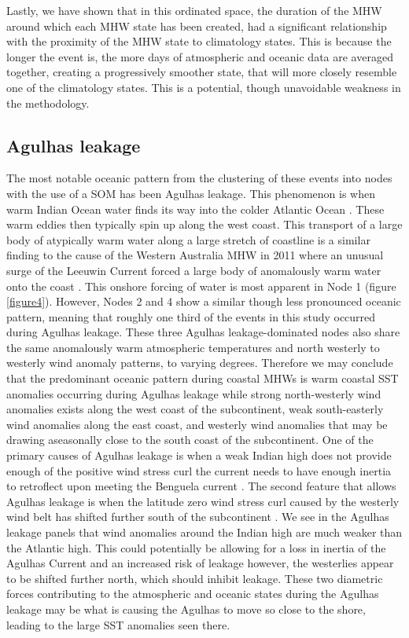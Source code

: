 \documentclass[utf8]{frontiersSCNS}
\begin{document}
Lastly, we have shown that in this ordinated space, the duration of the MHW around which each MHW state has been created, had a significant relationship with the proximity of the MHW state to climatology states. This is because the longer the event is, the more days of atmospheric and oceanic data are averaged together, creating a progressively smoother state, that will more closely resemble one of the climatology states. This is a potential, though unavoidable weakness in the methodology.

\subsection{Agulhas leakage}
The most notable oceanic pattern from the clustering of these events into nodes with the use of a SOM has been Agulhas leakage. This phenomenon is when warm Indian Ocean water finds its way into the colder Atlantic Ocean \citep{Beal2011}. These warm eddies then typically spin up along the west coast. This transport of a large body of atypically warm water along a large stretch of coastline is a similar finding to the cause of the Western Australia MHW in 2011 where an unusual surge of the Leeuwin Current forced a large body of anomalously warm water onto the coast \citep{Feng2013, Benthuysen2014}. This onshore forcing of water is most apparent in Node 1 (figure \ref{figure4}). However, Nodes 2 and 4 show a similar though less pronounced oceanic pattern, meaning that roughly one third of the events in this study occurred during Agulhas leakage. These three Agulhas leakage-dominated nodes also share the same anomalously warm atmospheric temperatures and north westerly to westerly wind anomaly patterns, to varying degrees. Therefore we may conclude that the predominant oceanic pattern during coastal MHWs is warm coastal SST anomalies occurring during Agulhas leakage while strong north-westerly wind anomalies exists along the west coast of the subcontinent, weak south-easterly wind anomalies along the east coast, and westerly wind anomalies that may be drawing aseasonally close to the south coast of the subcontinent. One of the primary causes of Agulhas leakage is when a weak Indian high does not provide enough of the positive wind stress curl the current needs to have enough inertia to retroflect upon meeting the Benguela current \citep{Beal2011}. The second feature that allows Agulhas leakage is when the latitude zero wind stress curl caused by the westerly wind belt has shifted further south of the subcontinent \citep{Beal2011}. We see in the Agulhas leakage panels that wind anomalies around the Indian high are much weaker than the Atlantic high. This could potentially be allowing for a loss in inertia of the Agulhas Current and an increased risk of leakage however, the westerlies appear to be shifted further north, which should inhibit leakage. These two diametric forces contributing to the atmospheric and oceanic states during the Agulhas leakage may be what is causing the Agulhas to move so close to the shore, leading to the large SST anomalies seen there.
\end{document}
